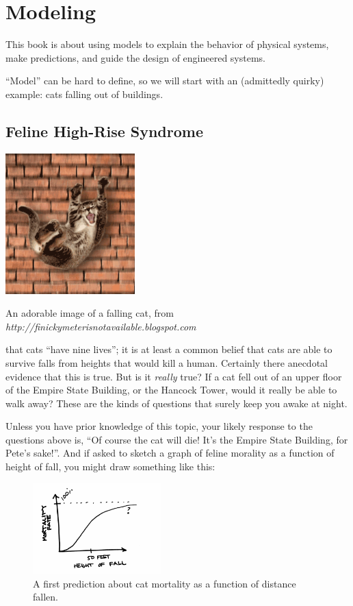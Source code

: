 


\chapter{Modeling}

This book is about using models to
explain the behavior of physical systems, make predictions, and
guide the design of engineered systems.

``Model'' can be hard to define, so we will start with an (admittedly
quirky) example: cats falling out of buildings.


\section{Feline High-Rise Syndrome}

\begin{marginfigure}
\includegraphics[width=5cm]{figs/CatFall}
\caption{An adorable image of a falling cat, from {\em{http://finickymeterisnotavailable.blogspot.com}}}
\end{marginfigure}

 that cats ``have nine lives''; it is at
least a common belief that cats are able to survive falls from heights
that would kill a human.  Certainly there anecdotal evidence that this
is true.  But is it {\it really} true?  If a cat fell out of an upper
floor of the Empire State Building, or the Hancock Tower, would it
really be able to walk away?  These are the kinds of questions that
surely keep you awake at night.

Unless you have prior knowledge of
this topic, your likely response to the questions above is, ``Of
course the cat will die!  It's the Empire State Building, for Pete's
sake!''.  And if asked to sketch a graph of feline morality as a
function of height of fall, you might draw something like this:

\begin{figure}[h!]
\centerline{\includegraphics[height=3.5cm]{figs/InitialPrediction}}
\caption{A first prediction about cat mortality as a function of distance fallen. }
\end{figure}



